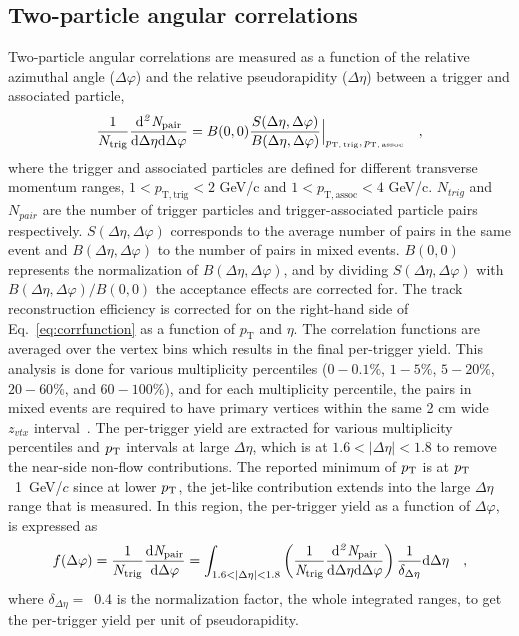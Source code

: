 \subsection{Two-particle angular correlations}
Two-particle angular correlations are measured as a function of the relative azimuthal angle ($\Delta\varphi$) and the relative pseudorapidity ($\Delta\eta$) between a trigger and associated particle,
\begin{eqnarray}
\frac{1}{N_{\rm{trig}}} \frac{ \rm{d}\it{}^{2} N_{\rm{pair}} }{ \rm{d} \Delta\eta \rm{d}\Delta\varphi} = B(0, 0)\frac{S(\Delta\eta, \Delta\varphi)}{B(\Delta\eta, \Delta\varphi)}  \Big\lvert_{p_\mathrm{T,\,trig},\,p_\mathrm{T,\,assoc}}\quad , 
\label{eq:corrfunction}
\end{eqnarray}
where the trigger and associated particles are defined for different transverse momentum ranges, $1<p_\mathrm{T,trig}<2$ GeV/c and $1<p_\mathrm{T,assoc}<4$ GeV/c. $N_{trig}$ and $N_{pair}$ are the number of trigger particles and trigger-associated particle pairs respectively. $S(\Delta\eta, \Delta\varphi)$ corresponds to the average number of pairs in the same event and $B(\Delta\eta, \Delta\varphi)$ to the number of pairs in mixed events. $B (0,0)$ represents the normalization of $B(\Delta\eta, \Delta\varphi)$, and by dividing $S(\Delta\eta, \Delta\varphi)$ with $B(\Delta\eta, \Delta\varphi)/B (0,0)$ the acceptance effects are corrected for. The track reconstruction efficiency is corrected for on the right-hand side of Eq.~\ref{eq:corrfunction} as a function of $p_\mathrm{T}$ and $\eta$. The correlation functions are averaged over the vertex bins which results in the final per-trigger yield. This analysis is done for various multiplicity percentiles ($0-0.1\%$, $1-5\%$, $5-20\%$, $20-60\%$, and $60-100\%$), and for each multiplicity percentile, the pairs in mixed events are required to have primary vertices within the same 2 cm wide $z_{vtx}$ interval~\cite{KOPYLOV1974472:evtmixing,Adam:2016tsv}. 
The per-trigger yield are extracted for various multiplicity percentiles and $p_\mathrm{T}$ intervals at large $\Delta\eta$, which is at $1.6<|\Delta\eta|<1.8$ to remove the near-side non-flow contributions. The reported minimum of $p_\mathrm{T}$  is at $p_\mathrm{T}$~1~GeV/$c$ since at lower $p_\mathrm{T}$, the jet-like contribution extends into the large $\Delta\eta$ range that is measured. In this region, the per-trigger yield as a function of $\Delta\varphi$, is expressed as
\begin{eqnarray}
f(\Delta\varphi) = \frac{1}{N_{\rm{trig}}} \frac{ \rm{d}\it{}N_{\rm{pair}} }{ \rm{d}\Delta\varphi } = \int_{1.6<|\Delta \eta|<1.8} \left( \frac{1}{\it{N}_{\rm{trig}}} \frac{ \rm{d}\it{}^{2} N_{\rm{pair}} }{ \rm{d}\Delta\eta d\Delta\varphi} \right) \dfrac{1}{\delta_{\Delta\eta}} \rm{d}\Delta \eta \quad ,
\label{eq:pertrigger}
\end{eqnarray}
where $\delta_{\Delta\eta}=$~0.4 is the normalization factor, the whole integrated ranges, to get the per-trigger yield per unit of pseudorapidity. 



